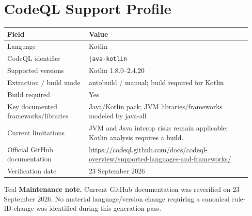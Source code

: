 \documentclass[10pt,letterpaper]{article}
\newcommand{\code}[1]{\texttt{\small #1}}
\begin{document}
\section{CodeQL Support Profile}
\begin{tabularx}{\textwidth}{@{}P{1.9in}Y@{}}
\toprule
\textbf{Field} & \textbf{Value}\\
\midrule
Language & Kotlin\\
CodeQL identifier & \code{java-kotlin}\\
Supported versions & Kotlin 1.8.0--2.4.20\\
Extraction / build mode & autobuild / manual; build required for Kotlin\\
Build required & Yes\\
Key documented frameworks/libraries & Java/Kotlin pack; JVM libraries/frameworks modeled by java-all\\
Current limitations & JVM and Java interop risks remain applicable; Kotlin analysis requires a build.\\
Official GitHub documentation & \url{https://codeql.github.com/docs/codeql-overview/supported-languages-and-frameworks/}\\
Verification date & 23 September 2026\\
\bottomrule
\end{tabularx}
\begin{callout}{Teal}
\textbf{Maintenance note.} Current GitHub documentation was reverified on 23 September 2026. No material language/version change requiring a canonical rule-ID change was identified during this generation pass.
\end{callout}
\end{document}
